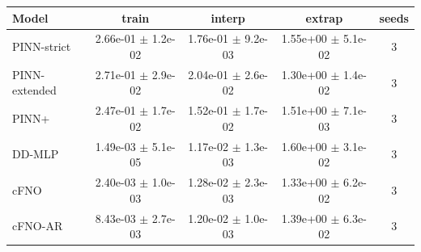 \begin{tabular}{lcccc}
\toprule
Model & train & interp & extrap & seeds \\
\midrule
PINN-strict & 2.66e-01 $\pm$ 1.2e-02 & 1.76e-01 $\pm$ 9.2e-03 & 1.55e+00 $\pm$ 5.1e-02 & 3 \\
PINN-extended & 2.71e-01 $\pm$ 2.9e-02 & 2.04e-01 $\pm$ 2.6e-02 & 1.30e+00 $\pm$ 1.4e-02 & 3 \\
PINN+ & 2.47e-01 $\pm$ 1.7e-02 & 1.52e-01 $\pm$ 1.7e-02 & 1.51e+00 $\pm$ 7.1e-03 & 3 \\
DD-MLP & 1.49e-03 $\pm$ 5.1e-05 & 1.17e-02 $\pm$ 1.3e-03 & 1.60e+00 $\pm$ 3.1e-02 & 3 \\
cFNO & 2.40e-03 $\pm$ 1.0e-03 & 1.28e-02 $\pm$ 2.3e-03 & 1.33e+00 $\pm$ 6.2e-02 & 3 \\
cFNO-AR & 8.43e-03 $\pm$ 2.7e-03 & 1.20e-02 $\pm$ 1.0e-03 & 1.39e+00 $\pm$ 6.3e-02 & 3 \\
\bottomrule
\end{tabular}
